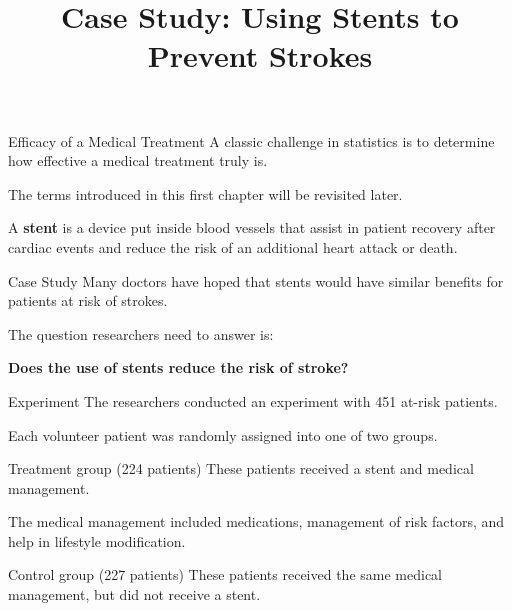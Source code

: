\documentclass{beamer}
\title[MA205 - Section 1.1]{Case Study: Using Stents to Prevent Strokes}
\begin{document}
\begin{frame}
\titlepage
\end{frame}

\begin{frame}
\begin{block}{Efficacy of a Medical Treatment}
A classic challenge in statistics is to determine how effective a medical treatment truly is.
\end{block}\pause

\begin{note}
The terms introduced in this first chapter will be revisited later. 
\end{note}\pause

\begin{definition}
A \textbf{stent} is a device put inside blood vessels that assist in patient recovery after cardiac events and reduce the risk of an additional heart attack or death.
\end{definition}\pause

\begin{block}{Case Study}
Many doctors have hoped that stents would have similar benefits for patients at risk of strokes.\pause

The question researchers need to answer is: 
\vspace{-1.5mm}\begin{center}\textbf{Does the use of stents reduce the risk of stroke?}\end{center}\vspace{0.1mm}
\end{block}
\end{frame}

\begin{frame}
\begin{block}{Experiment}
The researchers conducted an experiment with 451 at-risk patients.

Each volunteer patient was randomly assigned into one of two groups.
\end{block}\pause

\begin{block}{Treatment group (224 patients)}
These patients received a stent and medical management. 
\end{block}\pause

\begin{note}
The medical management included medications, management of risk factors, and help in lifestyle modification.
\end{note}\pause

\begin{block}{Control group (227 patients)}
These patients received the same medical management, but did not receive a stent.
\end{block}
\end{frame}
\end{document}

